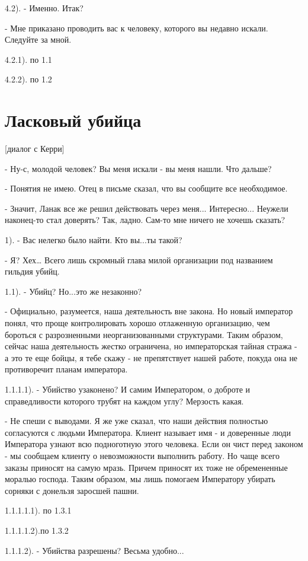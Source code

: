 \documentclass[12pt,a4paper]{book}
\begin{document}
4.2). - Именно. Итак?

- Мне приказано проводить вас к человеку, которого вы недавно искали. Следуйте за мной.

4.2.1). по 1.1

4.2.2). по 1.2

\section{Ласковый убийца}

[диалог с Керри]

- Ну-с, молодой человек? Вы меня искали - вы меня нашли. Что дальше?

- Понятия не имею. Отец в письме сказал, что вы сообщите все необходимое.

- Значит, Ланак все же решил действовать через меня... Интересно... Неужели наконец-то стал доверять? Так, ладно. Сам-то мне ничего не хочешь сказать?

1). - Вас нелегко было найти. Кто вы...ты такой?

- Я? Хех… Всего лишь скромный глава милой организации под названием гильдия убийц.

1.1). - Убийц? Но...это же незаконно?

- Официально, разумеется, наша деятельность вне закона. Но новый император понял, что проще контролировать хорошо отлаженную организацию, чем бороться с разрозненными неорганизованными структурами. Таким образом, сейчас наша деятельность жестко ограничена, но императорская тайная стража - а это те еще бойцы, я тебе скажу - не препятствует нашей работе, покуда она не противоречит планам императора.

1.1.1.1). - Убийство узаконено? И самим Императором, о доброте и справедливости которого трубят на каждом углу? Мерзость какая.

- Не спеши с выводами. Я же уже сказал, что наши действия полностью согласуются с людьми Императора. Клиент называет имя - и доверенные люди Императора узнают всю подноготную этого человека. Если он чист перед законом - мы сообщаем клиенту о невозможности выполнить работу. Но чаще всего заказы приносят на самую мразь. Причем приносят их тоже не обремененные моралью господа. Таким образом, мы лишь помогаем Императору убирать сорняки с донельзя заросшей пашни.

1.1.1.1.1). по 1.3.1

1.1.1.1.2).по 1.3.2

1.1.1.2). - Убийства разрешены? Весьма удобно...
\end{document}
